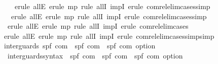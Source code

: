 \begin{isabellebody}
\isamarkupfalse%
\ \ \ \ {\isacharparenleft}erule\ allE{\isacharcomma}\ erule\ mp{\isacharcomma}\ {\isacharparenleft}rule\ allI\ impI{\isacharparenright}{\isacharplus}{\isacharcomma}\ erule\ com{\isacharunderscore}rel{\isacharunderscore}elim{\isacharunderscore}cases{\isacharcomma}simp{\isacharparenright}\isanewline
{}\isamarkupfalse%
\ \ \ {\isacharparenleft}erule\ allE{\isacharcomma}\ erule\ mp{\isacharcomma}\ {\isacharparenleft}rule\ allI\ impI{\isacharparenright}{\isacharplus}{\isacharcomma}\ erule\ com{\isacharunderscore}rel{\isacharunderscore}elim{\isacharunderscore}cases{\isacharcomma}simp{\isacharparenright}\isanewline
{}\isamarkupfalse%
\ \ {\isacharparenleft}erule\ allE{\isacharcomma}\ erule\ mp{\isacharcomma}\ {\isacharparenleft}rule\ allI\ impI{\isacharparenright}{\isacharplus}{\isacharcomma}\ erule\ com{\isacharunderscore}rel{\isacharunderscore}elim{\isacharunderscore}cases{\isacharparenright}\isanewline
{}\isamarkupfalse%
\ {\isacharparenleft}erule\ allE{\isacharcomma}\ erule\ mp{\isacharcomma}\ {\isacharparenleft}rule\ allI\ impI{\isacharparenright}{\isacharplus}{\isacharcomma}\ erule\ com{\isacharunderscore}rel{\isacharunderscore}elim{\isacharunderscore}cases{\isacharcomma}simp{\isacharcomma}simp{\isacharparenright}\isanewline
{}\isamarkupfalse%
%
\endisatagproof
{\isafoldproof}%
%
\isadelimproof
\isanewline
%
\endisadelimproof
\isanewline
{}\isamarkupfalse%
\ inter{\isacharunderscore}guards{\isacharcolon}{\isacharcolon}\ {\isachardoublequoteopen}{\isacharparenleft}{\isacharprime}s{\isacharcomma}{\isacharprime}p{\isacharcomma}{\isacharprime}f{\isacharparenright}\ com\ {\isasymtimes}\ {\isacharparenleft}{\isacharprime}s{\isacharcomma}{\isacharprime}p{\isacharcomma}{\isacharprime}f{\isacharparenright}\ com\ {\isasymRightarrow}\ {\isacharparenleft}{\isacharprime}s{\isacharcomma}{\isacharprime}p{\isacharcomma}{\isacharprime}f{\isacharparenright}\ com\ option{\isachardoublequoteclose}\isanewline
\isanewline
{}\isamarkupfalse%
\ \isanewline
\ \ inter{\isacharunderscore}guards{\isacharunderscore}syntax\ {\isacharcolon}{\isacharcolon}\ {\isachardoublequoteopen}{\isacharparenleft}{\isacharprime}s{\isacharcomma}{\isacharprime}p{\isacharcomma}{\isacharprime}f{\isacharparenright}\ com\ {\isasymRightarrow}\ {\isacharparenleft}{\isacharprime}s{\isacharcomma}{\isacharprime}p{\isacharcomma}{\isacharprime}f{\isacharparenright}\ com\ {\isasymRightarrow}\ {\isacharparenleft}{\isacharprime}s{\isacharcomma}{\isacharprime}p{\isacharcomma}{\isacharprime}f{\isacharparenright}\ com\ option{\isachardoublequoteclose}\isanewline

\end{isabellebody}
